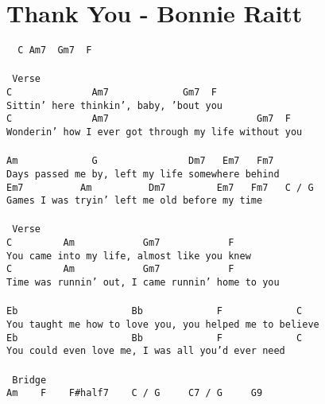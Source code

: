 \newpage
\section{Thank You - Bonnie Raitt}
\label{Thank You - Bonnie Raitt}
\texttt{\lbrack\ \ C\ Am7\ \ Gm7\ \ F\ \rbrack\\
\\
\lbrack\ Verse\rbrack\\
C\ \ \ \ \ \ \ \ \ \ \ \ \ \ Am7\ \ \ \ \ \ \ \ \ \ \ \ \ Gm7\ \ F\\
Sittin'\ here\ thinkin',\ baby,\ 'bout\ you\\
C\ \ \ \ \ \ \ \ \ \ \ \ \ \ Am7\ \ \ \ \ \ \ \ \ \ \ \ \ \ \ \ \ \ \ \ \ \ \ \ \ \ Gm7\ \ F\\
Wonderin'\ how\ I\ ever\ got\ through\ my\ life\ without\ you\\
\\
Am\ \ \ \ \ \ \ \ \ \ \ \ \ G\ \ \ \ \ \ \ \ \ \ \ \ \ \ \ \ Dm7\ \ \ Em7\ \ \ Fm7\\
Days\ passed\ me\ by,\ left\ my\ life\ somewhere\ behind\\
Em7\ \ \ \ \ \ \ \ \ \ Am\ \ \ \ \ \ \ \ \ \ Dm7\ \ \ \ \ \ \ \ \ Em7\ \ \ Fm7\ \ \ C\ /\ G\\
Games\ I\ was\ tryin'\ left\ me\ old\ before\ my\ time\\
\\
\lbrack\ Verse\rbrack\\
C\ \ \ \ \ \ \ \ \ Am\ \ \ \ \ \ \ \ \ \ \ \ Gm7\ \ \ \ \ \ \ \ \ \ \ \ F\\
You\ came\ into\ my\ life,\ almost\ like\ you\ knew\\
C\ \ \ \ \ \ \ \ \ Am\ \ \ \ \ \ \ \ \ \ \ \ Gm7\ \ \ \ \ \ \ \ \ \ \ \ F\\
Time\ was\ runnin'\ out,\ I\ came\ runnin'\ home\ to\ you\\
\\
Eb\ \ \ \ \ \ \ \ \ \ \ \ \ \ \ \ \ \ \ \ Bb\ \ \ \ \ \ \ \ \ \ \ \ \ F\ \ \ \ \ \ \ \ \ \ \ \ \ C\\
You\ taught\ me\ how\ to\ love\ you,\ you\ helped\ me\ to\ believe\\
Eb\ \ \ \ \ \ \ \ \ \ \ \ \ \ \ \ \ \ \ \ Bb\ \ \ \ \ \ \ \ \ \ \ \ \ F\ \ \ \ \ \ \ \ \ \ \ \ \ C\\
You\ could\ even\ love\ me,\ I\ was\ all\ you'd\ ever\ need\\
\\
\lbrack\ Bridge\rbrack\\
Am\ \ \ \ F\ \ \ \ F\#half7\ \ \ \ C\ /\ G\ \ \ \ \ C7\ /\ G\ \ \ \ \ G9\\
}
